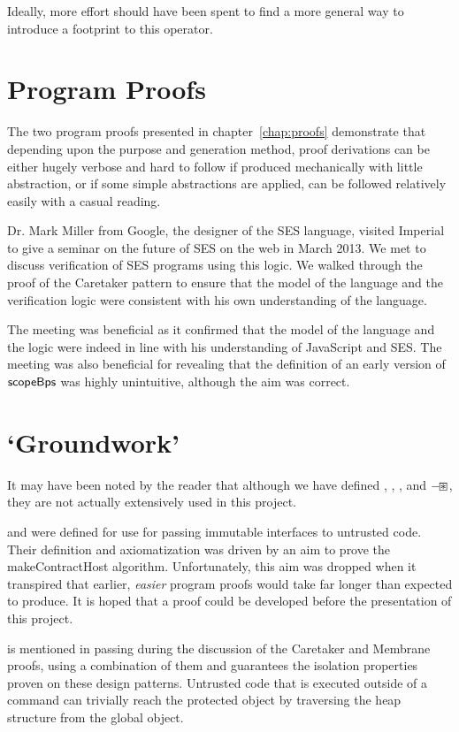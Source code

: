 \documentclass[a4paper,notitlepage]{report}
\begin{document}
Ideally, more effort should have been spent to find a more general way to
introduce a footprint to this operator.

\section{Program Proofs}
The two program proofs presented in chapter~\ref{chap:proofs} demonstrate that
depending upon the purpose and generation method, proof derivations can be
either hugely verbose and hard to follow if produced mechanically with little
abstraction, or if some simple abstractions are applied, can be followed
relatively easily with a casual reading.

Dr. Mark Miller from Google, the designer of the SES language, visited Imperial
to give a seminar on the future of SES on the web in March 2013. We met to
discuss verification of SES programs using this logic. We walked through the
proof of the Caretaker pattern to ensure that the model of the language and the
verification logic were consistent with his own understanding of the language.

The meeting was beneficial as it confirmed that the model of the language and
the logic were indeed in line with his understanding of JavaScript and SES. The
meeting was also beneficial for revealing that the definition of an early
version of $\mathsf{scopeBps}$ was highly unintuitive, although the aim was correct.

\section{`Groundwork'}
It may have been noted by the reader that although we have defined
, , , and $\mathbin{-\mkern-3mu \boxast}$, they are not actually
extensively used in this project.

 and  were defined for use for passing immutable interfaces
to untrusted code. Their definition and axiomatization was driven by an aim
to prove the makeContractHost algorithm\cite{contract-host-algo}. Unfortunately,
this aim was dropped when it transpired that earlier, \emph{easier} program
proofs would take far longer than expected to produce. It is hoped that a proof
could be developed before the presentation of this project.

 is mentioned in passing during the discussion of the Caretaker and
Membrane proofs, using a combination of them and  guarantees the
isolation properties proven on these design patterns. Untrusted code that is
executed outside of a  command can trivially reach the protected
object by traversing the heap structure from the global object.
\end{document}
